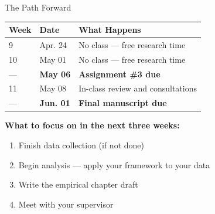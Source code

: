 \documentclass[aspectratio=169,11pt]{beamer}
\begin{document}
\begin{frame}{The Path Forward}
    \begin{table}
        \small
        \begin{tabular}{lll}
            \toprule
            \textbf{Week} & \textbf{Date} & \textbf{What Happens} \\
            \midrule
            9 & Apr. 24 & No class --- free research time \\
            10 & May 01 & No class --- free research time \\
            --- & \textbf{May 06} & \textbf{Assignment \#3 due} \\
            11 & May 08 & In-class review and consultations \\
            --- & \textbf{Jun. 01} & \textbf{Final manuscript due} \\
            \bottomrule
        \end{tabular}
    \end{table}
    \vspace{0.3cm}
    \textbf{What to focus on in the next three weeks:}
    \begin{enumerate}
        \item Finish data collection (if not done)
        \item Begin analysis --- apply your framework to your data
        \item Write the empirical chapter draft
        \item Meet with your supervisor
    \end{enumerate}
\end{frame}
\end{document}

